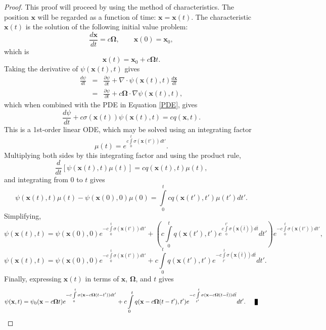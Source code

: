 \begin{proof}
   This proof will proceed by using the method of characteristics. The position
   $\mathbf{x}$ will be regarded as a function of time: $\mathbf{x}=\mathbf{x}(t)$.
   The characteristic $\mathbf{x}(t)$ is the solution of the following initial value problem:
   \[
      \frac{d\mathbf{x}}{dt} = c\mathbf{\Omega},\qquad \mathbf{x}(0) = \mathbf{x}_0,
   \]
   which is
   \[
      \mathbf{x}(t) = \mathbf{x}_0 + c\mathbf{\Omega}t.
   \]
   Taking the derivative of $\psi(\mathbf{x}(t),t)$ gives
   \begin{eqnarray*}
      \frac{d\psi}{dt} & = &\frac{\partial\psi}{\partial t} +
      \nabla\cdot\psi(\mathbf{x}(t),t) \frac{d\mathbf{x}}{dt}\\
      & = &\frac{\partial \psi}{\partial t} +
      c\mathbf{\Omega}\cdot\nabla\psi(\mathbf{x}(t),t),
   \end{eqnarray*}
   which when combined with the PDE in Equation \eqref{PDE}, gives
   \[
      \frac{d\psi}{dt} + c\sigma(\mathbf{x}(t))\psi(\mathbf{x}(t),t) = c q(\mathbf{x},t).
   \]
   This is a 1st-order linear ODE, which may be solved using an integrating factor
   \[
      \mu(t)=e^{c\int\limits_0^t\sigma(\mathbf{x}(t'))dt'}.
   \]
   Multiplying both sides by this integrating factor and using the product rule,
   \[
      \frac{d}{dt}\left[\psi(\mathbf{x}(t),t)\mu(t)\right] = c q(\mathbf{x}(t),t) \mu(t),
   \]
   and integrating from $0$ to $t$ gives
   \[
      \psi(\mathbf{x}(t),t)\mu(t)-\psi(\mathbf{x}(0),0)\mu(0) =
         \int\limits_0^t c q(\mathbf{x}(t'),t') \mu(t') dt'.
   \]
   Simplifying,
   \[
      \psi(\mathbf{x}(t),t) = \psi(\mathbf{x}(0),0)
         e^{-c\int\limits_0^t \sigma(\mathbf{x}(t'))dt'} +
         \left(c \int\limits_0^t q(\mathbf{x}(t'),t')
         e^{c\int\limits_0^{t'}\sigma(\mathbf{x}(\bar{t}))d\bar{t}} dt'\right)
         e^{-c\int\limits_0^t\sigma(\mathbf{x}(t'))dt'},
   \]
   \[
      \psi(\mathbf{x}(t),t) = \psi(\mathbf{x}(0),0)
         e^{-c\int\limits_0^t \sigma(\mathbf{x}(t'))dt'} +
         c \int\limits_0^t q(\mathbf{x}(t'),t')
         e^{-c\int\limits_{t'}^t\sigma(\mathbf{x}(\bar{t}))d\bar{t}} dt'.
   \]
   Finally, expressing $\mathbf{x}(t)$ in terms of $\mathbf{x}$, $\mathbf{\Omega}$,
   and $t$ gives
   \[
      \psi(\mathbf{x},t) = \psi_0(\mathbf{x} - c\mathbf{\Omega}t)
         e^{-c\int\limits_0^t \sigma(\mathbf{x} - c\mathbf{\Omega}(t -t'))dt'} +
         c \int\limits_0^t q(\mathbf{x} - c\mathbf{\Omega}(t -t'),t')
         e^{-c\int\limits_{t'}^t\sigma(\mathbf{x}
         - c\mathbf{\Omega}(t -\bar{t}))d\bar{t}} dt'.\qed
   \]
\end{proof}
